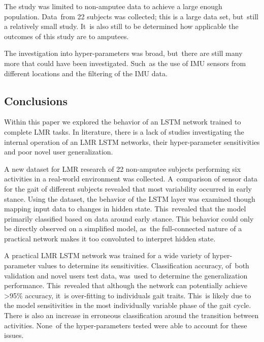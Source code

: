 The study was limited to non-amputee data to achieve a large enough population. Data~from 22 subjects was collected; this is a large data set, but~still a relatively small study. It~is also still to be determined how applicable the outcomes of this study are to amputees.

The investigation into hyper-parameters was broad, but~there are still many more that could have been investigated. Such~as the use of IMU sensors from different locations and the filtering of the IMU data.


\subsection{Conclusions}
\label{sec:conclusion}
Within this paper we explored the behavior of an LSTM network trained to complete LMR tasks. In literature, there is a lack of studies investigating the internal operation of an LMR LSTM networks, their hyper-parameter sensitivities and poor novel user generalization.

A new dataset for LMR research of 22 non-amputee subjects performing six activities in a real-world environment was collected. A~comparison of sensor data for the gait of different subjects revealed that most variability occurred in early stance. Using the dataset, the behavior of the LSTM layer was examined though mapping input data to changes in hidden state. This~revealed that the model primarily classified based on data around early stance. This behavior could only be directly observed on a simplified model, as~the full-connected nature of a practical network makes it too convoluted to interpret hidden state.

A practical LMR LSTM network was trained for a wide variety of hyper-parameter values to determine its sensitivities. Classification accuracy, of~both validation and novel users test data, was~used to determine the generalization performance. This~revealed that although the network can potentially achieve >95\% accuracy, it~is over-fitting to individuals gait traits. This~is likely due to the model sensitivities in the most individually variable phase of the gait cycle. There is also an increase in erroneous classification around the transition between activities. None~of the hyper-parameters tested were able to account for these issues.

